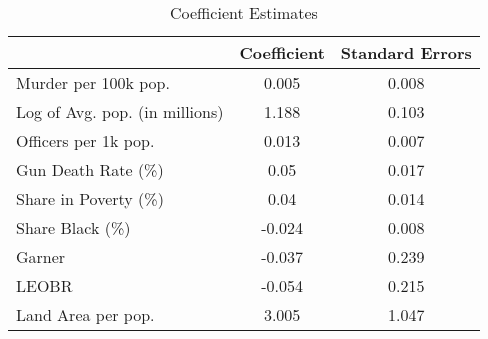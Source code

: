 \begin{table}[ht]
\centering
\caption{Coefficient Estimates} \label{table:coefficients}
\begin{tabular}{lcc}
\hline \hline
& Coefficient & Standard Errors \\ 
\hline
Murder per 100k pop. &0.005&0.008\\
Log of Avg. pop. (in millions) &1.188&0.103\\
Officers per 1k pop. &0.013&0.007\\
Gun Death Rate (\%) &0.05&0.017\\
Share in Poverty (\%) &0.04&0.014\\
Share Black (\%) &-0.024&0.008\\
Garner &-0.037&0.239\\
LEOBR &-0.054&0.215\\
Land Area per pop. &3.005&1.047\\
\hline \end{tabular} \end{table}